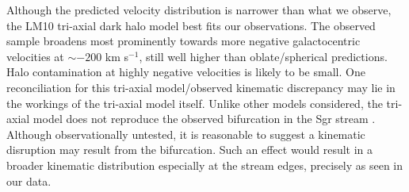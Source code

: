 \documentclass[preprint2]{aastex}
\begin{document}
	Although the predicted velocity distribution is narrower than what we observe, the LM10 tri-axial dark halo model best fits our observations. The observed sample broadens most prominently towards more negative galactocentric velocities at $\sim-200$ km s$^{-1}$, still well higher than oblate/spherical predictions. Halo contamination at highly negative velocities is likely to be small. One reconciliation for this tri-axial model/observed kinematic discrepancy may lie in the workings of the tri-axial model itself. Unlike other models considered, the tri-axial model does not reproduce the observed bifurcation in the Sgr stream \citep{Belokurov;et-al_2006}. Although observationally untested, it is reasonable to suggest a kinematic disruption may result from the bifurcation. Such an effect would result in a broader kinematic distribution especially at the stream edges, precisely as seen in our data.

	
\end{document}

